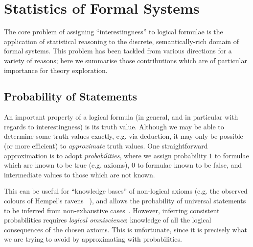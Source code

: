 \section{Statistics of Formal Systems}

\iffalse
TODO: Alison: I'd like to revisit this chapter once I see the whole
thesis. At the moment it feels in parts more like a discussion of your work,
than of related work. It might help to read other people's related work sections
to get a better idea of what to include here. I think it'll be more obvious too,
once we have the intro, etc. I suspect you'll need to do a fair bit more work on
this one.
\fi

The core problem of assigning ``interestingness'' to logical formulae is the
application of statistical reasoning to the discrete, semantically-rich domain
of formal systems. This problem has been tackled from various directions for a
variety of reasons; here we summarise those contributions which are of
particular importance for theory exploration.

\iffalse
\subsection{Clustering}
\label{sec:clustering}

\cite{journals/corr/abs-1212-3618}
\cite{heras2013proof}
\fi

\subsection{Probability of Statements}

An important property of a logical formula (in general, and in particular with
regards to interestingness) is its truth value. Although we may be able to
determine some truth values exactly, e.g. via deduction, it may only be possible
(or more efficient) to \emph{approximate} truth values. One straightforward
approximation is to adopt \emph{probabilities}, where we assign probability $1$
to formulae which are known to be true (e.g. axioms), $0$ to formulae known to
be false, and intermediate values to those which are not known.

This can be useful for ``knowledge bases'' of non-logical axioms (e.g. the
observed colours of Hempel's ravens~\cite{10.1093/mind/LIV.214.97} \iffalse
TODO: Alison: Maybe a bit of explanation here \fi), and allows the probability of
universal statements to be inferred from non-exhaustive
cases~\cite{Hutter.Lloyd.Ng.ea:2013}. However, inferring consistent
probabilities requires \emph{logical omniscience}: knowledge of all the logical
consequences of the chosen axioms. This is unfortunate, since it is precisely
what we are trying to avoid by approximating with probabilities.

